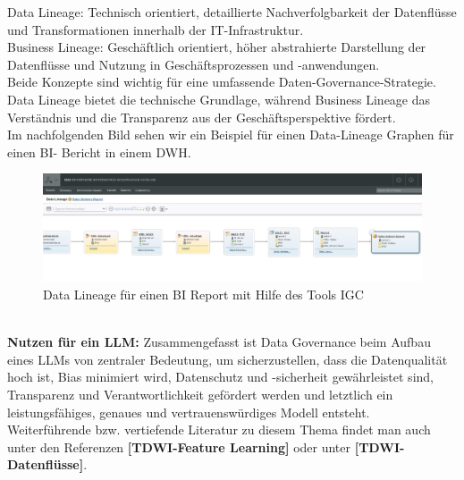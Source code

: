 \documentclass[12pt]{article}
\begin{document}
Data Lineage: Technisch orientiert, detaillierte Nachverfolgbarkeit der Datenflüsse und Transformationen innerhalb der IT-Infrastruktur.\\
Business Lineage: Geschäftlich orientiert, höher abstrahierte Darstellung der Datenflüsse und Nutzung in Geschäftsprozessen und -anwendungen.\\
Beide Konzepte sind wichtig für eine umfassende Daten-Governance-Strategie. Data Lineage bietet die technische Grundlage, während Business Lineage das Verständnis und die Transparenz aus der Geschäftsperspektive fördert. \\
Im nachfolgenden Bild sehen wir ein Beispiel für einen Data-Lineage Graphen für einen BI- Bericht in einem DWH.
\\[0.2cm] 
%
\begin{figure}[htp]
  \centering
  \hspace*{-0.5cm} 
  \includegraphics[width=1.1\textwidth]{IGC-DataLineage}
  \caption{Data Lineage für einen BI Report mit Hilfe des Tools IGC}
  \label{fig:IGC-DataLineage}
\end{figure}\\[0.2cm]
\textbf{Nutzen für ein LLM:} Zusammengefasst ist Data Governance beim Aufbau eines LLMs von zentraler Bedeutung, um sicherzustellen, dass die Datenqualität hoch ist, Bias minimiert wird, Datenschutz und -sicherheit gewährleistet sind, Transparenz und Verantwortlichkeit gefördert werden und letztlich ein leistungsfähiges, genaues und vertrauenswürdiges Modell entsteht. \\[0.1cm]
Weiterführende bzw. vertiefende Literatur zu diesem Thema findet man auch unter den Referenzen \textbf{[TDWI-Feature Learning]} oder unter \textbf{[TDWI-Datenflüsse]}.  \\[0.2cm]
%
\end{document}
